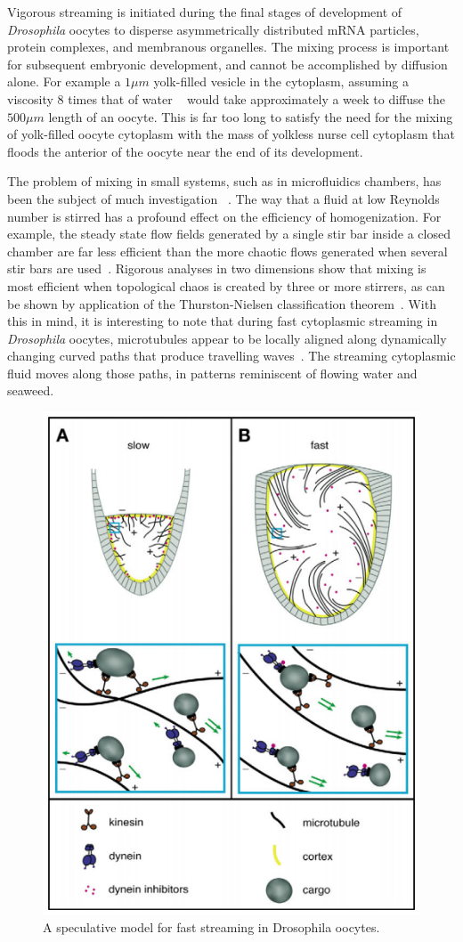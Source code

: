 \documentclass[11pt]{ucthesis}
\begin{document}
Vigorous streaming is initiated during the final stages of
development of {\em Drosophila} oocytes to disperse asymmetrically
distributed mRNA particles, protein complexes, and membranous
organelles.  The mixing process is important for subsequent
embryonic development, and cannot be accomplished by
diffusion alone.  For example  a $ 1\mu m$ yolk-filled vesicle in
the cytoplasm, assuming a viscosity 8 times that of water ~\cite{LubyPhelps}
would take approximately a week to diffuse the $500 \mu m$  length
of an oocyte. This is far too long to satisfy the need for the mixing
of yolk-filled oocyte cytoplasm with the mass of yolkless nurse
cell cytoplasm that floods the anterior of the oocyte near the
end of its development.

The problem of mixing in small systems, such as in microfluidics
chambers, has been the subject of much investigation ~\cite{Squires}. The
way that a fluid at low Reynolds number is stirred has a
profound effect on the efficiency of homogenization. For
example,  the steady state flow fields generated by a single
stir bar inside a closed chamber are far less efficient than
the more chaotic flows generated when  several stir bars are used~\cite{Aref,Aref2000}.
Rigorous analyses in two dimensions show that mixing is
most efficient when topological chaos is created by three or more
stirrers, as can be shown by application of the Thurston-Nielsen
classification theorem~\cite{Thurston,Fathi,Handel}.  With this in mind, it is
interesting to note that during fast cytoplasmic streaming in
{\em Drosophila} oocytes, microtubules appear to be locally aligned
along dynamically changing curved paths that produce travelling
waves~\cite{SerbusSaxton}.  
The streaming cytoplasmic fluid moves along those paths, in patterns reminiscent
of flowing water and seaweed.
\begin{figure}[htp]
\begin{center}
\includegraphics[width=0.5\hsize]{biomodel.png}
\caption{ 
A speculative model for fast streaming in Drosophila oocytes.
}
\label{fig:spheres}
\end{center}
\end{figure}
\end{document}
